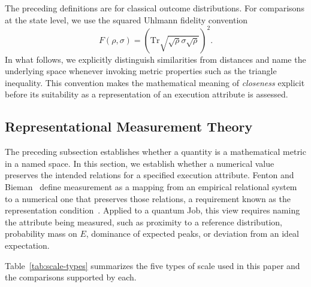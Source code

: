 \documentclass[10pt,conference]{IEEEtran}
\begin{document}
The preceding definitions are for classical outcome distributions. For comparisons at the state level, we use the squared Uhlmann fidelity convention
\begin{equation}
F(\rho,\sigma)=
\left(\mathrm{Tr}\sqrt{\sqrt{\rho}\sigma\sqrt{\rho}}\right)^2.
\label{eq:uhlmann-fidelity}
\end{equation}
In what follows, we explicitly distinguish similarities from distances and name the underlying space whenever invoking metric properties such as the triangle inequality. This convention makes the mathematical meaning of \emph{closeness} explicit before its suitability as a representation of an execution attribute is assessed.

\subsection{Representational Measurement Theory}
\label{sec:fenton}

The preceding subsection establishes whether a quantity is a mathematical metric in a named space. In this section, we establish whether a numerical value preserves the intended relations for a specified execution attribute. Fenton and Bieman~\cite{fentonBieman2015} define measurement as a mapping from an empirical relational system to a numerical one that preserves those relations, a requirement known as the representation condition~\cite{polancic2017complexity}. Applied to a quantum Job, this view requires naming the attribute being measured, such as proximity to a reference distribution, probability mass on $E$, dominance of expected peaks, or deviation from an ideal expectation.

Table~\ref{tab:scale-types} summarizes the five types of scale used in this paper and the comparisons supported by each.
\end{document}
